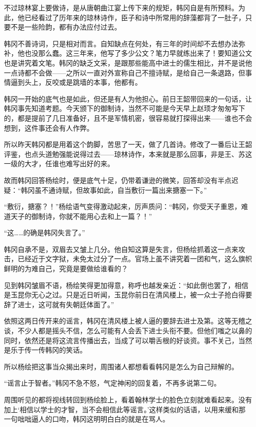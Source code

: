 不过琼林宴上要做诗，是从唐朝曲江宴上传下来的规矩，韩冈自是有所预料。为此，他已经看过了历年来的琼林诗作，臣子和诗中所常用的辞藻都背了一肚子，只要不是一些险韵，都有办法应付过去。

韩冈不善诗词，只是相对而言。自知缺点在何处，有三年的时间却不去想办法弥补，他也没那么蠢。这三年来，他写了多少公文？笔力早就练出来了！要知道公文也是讲究着文笔。韩冈的缺乏文采，是跟那些能高中进士的儒生相比，并不是说他一点诗都不会做——之所以一直对外宣称自己不擅诗赋，是给自己一条退路，但事情逼到头上，反咬或是跳墙的本事，他都有。

韩冈一开始的底气也是如此，但还是有人为他担心。前日王韶带回来的一句话，让韩冈事先知道考题。今天颁下的御制诗，当然不可能是今天早上赵顼才匆匆写下的，都是提前了几日准备好，且不是军情机密，很容易就打探得出来——谁也不会想到，这件事还会有人作弊。

所以昨天韩冈都是用着这个韵脚，苦思了一天，做了几首诗。修改了一番后让王韶评鉴，也点头道勉强能说得过去——琼林诗作，本来就是那么回事，非是王、苏这一级的大才，任谁也难写出好的来。

故而韩冈回答杨绘时，便是底气十足，仍带着谦逊的微笑，回答却没有半点迟疑：“韩冈虽不通诗赋，但故事如此，自当敷衍一篇出来搪塞一下。”

“敷衍，搪塞？！”杨绘语气变得激动起来，厉声质问：“韩冈，你受天子重恩，难道天子的御制诗，你就不能用心去和上一篇？！”

“这……的确是韩冈失言了。”

韩冈自承不是，双眉去又皱上几分。他自知这算是失言，但杨绘抓着这一点来攻击，已经近于文字狱，未免太过分了一点。官场上虽不讲究着一团和气，这么旗帜鲜明的为难自己，究竟是要做给谁看的？

见到韩冈皱眉不语，杨绘笑得更加得意，称呼也越发亲近：“如此倒也罢了，相信是玉昆你无心之过。只是近日听闻，玉昆你前日在清风楼上，被一众士子抢白得要辞了进士，这可就有失朝廷体面了。”

依照这两日传开来的谣言，韩冈在清风楼上被人逼的要辞去进士及第。这等无稽之谈，不少人都是摇头不信，怎么可能有人会丢下进士头衔不要。但他们嗤之以鼻的同时，依然还是将这流言传播出去，当成了可以嚼舌根的好谈资。事不关己，当然是乐于传一传韩冈的笑话。

所以杨绘把这事当众揭出来时，周围诸人都想看看韩冈是怎么为自己辩解的。

“谣言止于智者。”韩冈不急不怒，气定神闲的回复着，不再多说第二句。

周围听见的都将视线转回到杨绘脸上，看着翰林学士的脸色立刻就难看起来。没有加上‘相信以学士的才智，当不会相信此等谣言。’这样类似的话语，以用来缓和那一句咄咄逼人的口吻，韩冈这明明白白的就是在骂人。

